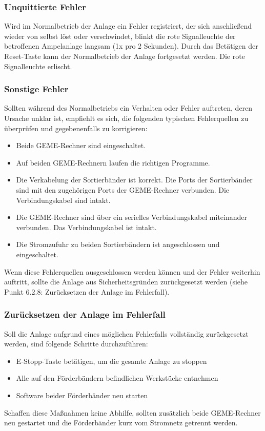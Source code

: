 \documentclass[oneside,a4paper,titlepage]{scrartcl} %
\begin{document}
\subsubsection{Unquittierte Fehler}
Wird im Normalbetrieb der Anlage ein Fehler registriert, der sich anschließend wieder von selbst löst oder verschwindet, blinkt die rote Signalleuchte der betroffenen Ampelanlage langsam (1x pro 2 Sekunden). Durch das Betätigen der Reset-Taste kann der Normalbetrieb der Anlage fortgesetzt werden. Die rote Signalleuchte erlischt.

\subsubsection{Sonstige Fehler}
Sollten während des Normalbetriebs ein Verhalten oder Fehler auftreten, deren Ursache unklar ist, empfiehlt es sich, die folgenden typischen Fehlerquellen zu überprüfen und gegebenenfalls zu korrigieren:
\begin{itemize}
    \item Beide GEME-Rechner sind eingeschaltet.
    \item Auf beiden GEME-Rechnern laufen die richtigen Programme.
    \item Die Verkabelung der Sortierbänder ist korrekt. Die Ports der Sortierbänder sind mit den zugehörigen Ports der GEME-Rechner verbunden. Die Verbindungskabel sind intakt.
    \item Die GEME-Rechner sind über ein serielles Verbindungskabel miteinander verbunden. Das Verbindungskabel ist intakt.
    \item Die Stromzufuhr zu beiden Sortierbändern ist angeschlossen und eingeschaltet.
\end{itemize}
Wenn diese Fehlerquellen ausgeschlossen werden können und der Fehler weiterhin auftritt, sollte die Anlage aus Sicherheitsgründen zurückgesetzt werden (siehe Punkt 6.2.8: Zurücksetzen der Anlage im Fehlerfall).

\subsubsection{Zurücksetzen der Anlage im Fehlerfall}
Soll die Anlage aufgrund eines möglichen Fehlerfalls vollständig zurückgesetzt werden, sind folgende Schritte durchzuführen:
\begin{itemize}
  \item E-Stopp-Taste betätigen, um die gesamte Anlage zu stoppen
  \item Alle auf den Förderbändern befindlichen Werkstücke entnehmen
  \item Software beider Förderbänder neu starten  
\end{itemize}
Schaffen diese Maßnahmen keine Abhilfe, sollten zusätzlich beide GEME-Rechner neu gestartet und die Förderbänder kurz vom Stromnetz getrennt werden.
\end{document}
